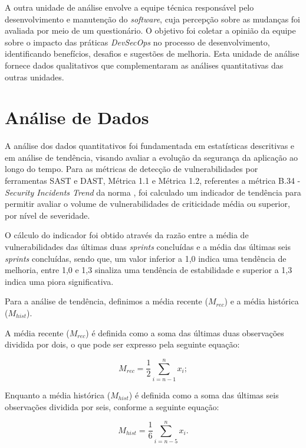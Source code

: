 A outra unidade de análise envolve a equipe técnica responsável pelo desenvolvimento e manutenção do \textit{software}, cuja percepção sobre as mudanças foi avaliada por meio de um questionário. O objetivo foi coletar a opinião da equipe sobre o impacto das práticas \textit{DevSecOps} no processo de desenvolvimento, identificando benefícios, desafios e sugestões de melhoria. Esta unidade de análise fornece dados qualitativos que complementaram as análises quantitativas das outras unidades.

\section{Análise de Dados}

A análise dos dados quantitativos foi fundamentada em estatísticas descritivas e em análise de tendência, visando avaliar a evolução da segurança da aplicação ao longo do tempo. Para as métricas de detecção de vulnerabilidades por ferramentas SAST e DAST, Métrica 1.1 e Métrica 1.2, referentes a métrica B.34 - \textit{Security Incidents Trend} da norma , foi calculado um indicador de tendência para permitir avaliar o volume de vulnerabilidades de criticidade média ou superior, por nível de severidade.

O cálculo do indicador foi obtido através da razão entre a média de vulnerabilidades das últimas duas \textit{sprints} concluídas e a média das últimas seis \textit{sprints} concluídas, sendo que, um valor inferior a 1,0 indica uma tendência de melhoria, entre 1,0 e 1,3 sinaliza uma tendência de estabilidade e superior a 1,3 indica uma piora significativa.

Para a análise de tendência, definimos a média recente ($M_{rec}$) e a média histórica ($M_{hist}$). 

A média recente ($M_{rec}$) é definida como a soma das últimas duas observações dividida por dois, o que pode ser expresso pela seguinte equação:

\begin{equation}
    M_{rec} = \frac{1}{2} \sum_{i=n-1}^{n} x_i;
\end{equation}

Enquanto a média histórica ($M_{hist}$) é definida como a soma das últimas seis observações dividida por seis, conforme a seguinte equação:

\begin{equation}
    M_{hist} = \frac{1}{6} \sum_{i=n-5}^{n} x_i.
\end{equation}

